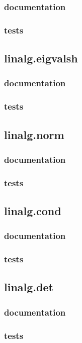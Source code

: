 \documentclass[a4paper,11pt]{article}
\begin{document}
\subsubsection{documentation}
\subsubsection{tests}
\subsection{linalg.eigvalsh}

\subsubsection{documentation}
\subsubsection{tests}
\subsection{linalg.norm}

\subsubsection{documentation}
\subsubsection{tests}
\subsection{linalg.cond}

\subsubsection{documentation}
\subsubsection{tests}
\subsection{linalg.det}

\subsubsection{documentation}
\subsubsection{tests}
\end{document}
